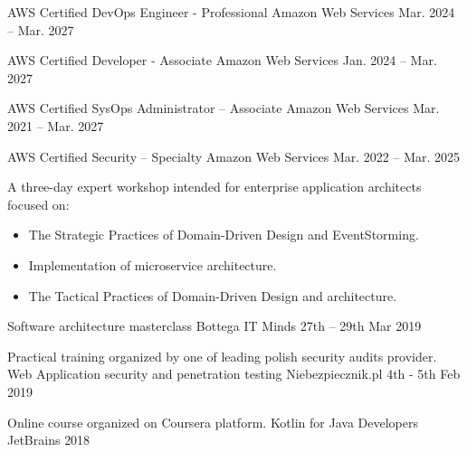 

\begin{cventries}

  \cventry
    {} %
    {AWS Certified DevOps Engineer - Professional} %
    {Amazon Web Services} %
    {Mar. 2024 – Mar. 2027} %
    {} 
 
 
  \cventry
    {} %
    {AWS Certified Developer - Associate} %
    {Amazon Web Services} %
    {Jan. 2024 – Mar. 2027} %
    {}
    
  \cventry
    {} %
    {AWS Certified SysOps Administrator – Associate} %
    {Amazon Web Services} %
    {Mar. 2021 – Mar. 2027} %
    {}
    
   \cventry
    {} %
    {AWS Certified Security – Specialty} %
    {Amazon Web Services} %
    {Mar. 2022 – Mar. 2025} %
    {}

  \cventry
    {A three-day expert workshop intended for enterprise application architects focused on: 
\begin{itemize}
  \item The Strategic Practices of Domain-Driven Design and EventStorming.
  \item Implementation of microservice architecture.
  \item The Tactical Practices of Domain-Driven Design and architecture. 
\end{itemize}\vspace*{-\baselineskip} } %
    {Software architecture masterclass} %
    {Bottega IT Minds} %
    {27th – 29th Mar 2019} %
    {}

  \cventry
    {Practical training organized by one of leading polish security audits provider. } %
    {Web Application security and penetration testing} %
    {Niebezpiecznik.pl} %
    {4th - 5th Feb 2019} %
    {}

      
  \cventry
    {Online course organized on Coursera platform. } %
    {Kotlin for Java Developers} %
    {JetBrains} %
    {2018} %
    {}
    

    
\end{cventries}
